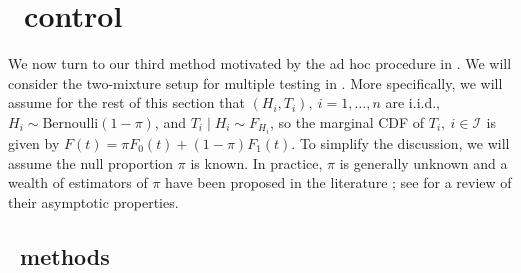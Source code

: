 \documentclass[a4paper,11pt]{article}
\theoremstyle{plain}
\theoremstyle{definition}
\newtheorem{remark}{Remark}
\def\calI{\mathcal{I}}
\theoremstyle{plain}
\newcommand{\No}{{n}}
\newcommand{\NoNc}{m}
\newcommand{\probNull}{{\pi}}
\newcommand{\testStatistics}[1]{{T_{#1}}}
\newcommand{\cdfTestStatistics}[1]{{F_{#1}}}
\newcommand{\hypothesis}[1]{{H_{#1}}}
\newcommand{\hypothesisIndex}[1]{{\calI_{#1}}}
\newcommand{\nullHypothesisIndex}{{\calI_{0}}}
\newcommand{\LocalFDR}{\text{Local-FDR}}
\newcommand{\pdfBased}{{\text{PDF-based}}}
\begin{document}

\section{\LocalFDR~control}\label{sec:localFDR}

We now turn to our third method motivated by the ad hoc procedure in
\textcite{hung14_proteom_mappin_human_mitoc_inter}. We will consider
the two-mixture setup for multiple testing in
. More specifically, we will assume for
the rest of this section that $(\hypothesis{i},
\testStatistics{i}),~i=1,\dotsc,\No$ are i.i.d., $\hypothesis{i} \sim
\text{Bernoulli}(1 - \pi)$, and $\testStatistics{i} \mid
\hypothesis{i} \sim \cdfTestStatistics{\hypothesis{i}}$, so the
marginal CDF of $T_i,~i \in \hypothesisIndex{}$ is given by $F(t) =
\pi F_0(t) + (1 - \pi) F_1(t)$. To simplify
the discussion, we will assume the null proportion $\probNull$ is
known. In practice, $\probNull$ is generally unknown and a wealth of
estimators of $\probNull$ have been proposed in the literature
\cite{schweder1982plots, hochberg1990more, hengartner1995finite,
  swanepoel1999limiting, benjamini2000adaptive, storey2002direct,
  jin2007estimating}; see \cite{genovese2004stochastic} for a review
of their asymptotic properties.

\subsection{\pdfBased\ methods}
\label{sec:pdfbased-methods}
\end{document}
